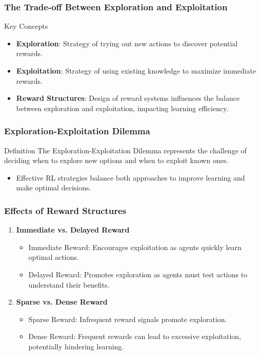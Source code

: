 \documentclass[aspectratio=169]{beamer}
\begin{document}
\begin{frame}[fragile]
    \frametitle{The Trade-off Between Exploration and Exploitation}
    \begin{block}{Key Concepts}
        \begin{itemize}
            \item \textbf{Exploration}: Strategy of trying out new actions to discover potential rewards.
            \item \textbf{Exploitation}: Strategy of using existing knowledge to maximize immediate rewards.
            \item \textbf{Reward Structures}: Design of reward systems influences the balance between exploration and exploitation, impacting learning efficiency.
        \end{itemize}
    \end{block}
\end{frame}

\begin{frame}[fragile]
    \frametitle{Exploration-Exploitation Dilemma}
    \begin{block}{Definition}
        The Exploration-Exploitation Dilemma represents the challenge of deciding when to explore new options and when to exploit known ones.
    \end{block}
    \begin{itemize}
        \item Effective RL strategies balance both approaches to improve learning and make optimal decisions.
    \end{itemize}
\end{frame}

\begin{frame}[fragile]
    \frametitle{Effects of Reward Structures}
    \begin{enumerate}
        \item \textbf{Immediate vs. Delayed Reward}
            \begin{itemize}
                \item Immediate Reward: Encourages exploitation as agents quickly learn optimal actions.
                \item Delayed Reward: Promotes exploration as agents must test actions to understand their benefits.
            \end{itemize}
        \item \textbf{Sparse vs. Dense Reward}
            \begin{itemize}
                \item Sparse Reward: Infrequent reward signals promote exploration.
                \item Dense Reward: Frequent rewards can lead to excessive exploitation, potentially hindering learning.
            \end{itemize}
    \end{enumerate}
\end{frame}
\end{document}
